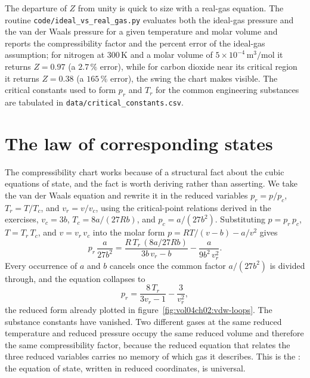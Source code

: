 

The departure of $Z$ from unity is quick to size with a real-gas
equation. The routine \texttt{code/ideal\_vs\_real\_gas.py} evaluates
both the ideal-gas pressure and the van der Waals pressure for a given
temperature and molar volume and reports the compressibility factor and
the percent error of the ideal-gas assumption; for nitrogen at
$300\,\si{\kelvin}$ and a molar volume of $5\times 10^{-4}\,\text{m}^3/
\text{mol}$ it returns $Z = 0.97$ (a $2.7\,\%$ error), while for carbon
dioxide near its critical region it returns $Z = 0.38$ (a $165\,\%$
error), the swing the chart makes visible. The critical constants used
to form $p_r$ and $T_r$ for the common engineering substances are
tabulated in \texttt{data/critical\_constants.csv}.

\section{The law of corresponding states}

The compressibility chart works because of a structural fact about the
cubic equations of state, and the fact is worth deriving rather than
asserting. We take the van der Waals equation and rewrite it in the
reduced variables $p_r = p/p_c$, $T_r = T/T_c$, and $v_r = v/v_c$, using
the critical-point relations derived in the exercises, $v_c = 3b$, $T_c =
8a/(27Rb)$, and $p_c = a/(27b^2)$. Substituting $p = p_r\,p_c$, $T =
T_r\,T_c$, and $v = v_r\,v_c$ into the molar form $p = RT/(v-b) - a/v^2$
gives
\[
p_r\,\frac{a}{27b^2} = \frac{R\,T_r\,(8a/27Rb)}{3b\,v_r - b} -
\frac{a}{9b^2\,v_r^2}.
\]
Every occurrence of $a$ and $b$ cancels once the common factor $a/(27b^2)$
is divided through, and the equation collapses to
\[
p_r = \frac{8\,T_r}{3v_r - 1} - \frac{3}{v_r^2},
\]
the reduced form already plotted in figure~\ref{fig:vol04ch02:vdw-loops}.
The substance constants have vanished. Two different gases at the same
reduced temperature and reduced pressure occupy the same reduced volume
and therefore the same compressibility factor, because the reduced
equation that relates the three reduced variables carries no memory of
which gas it describes. This is the :
the equation of state, written in reduced coordinates, is universal.

